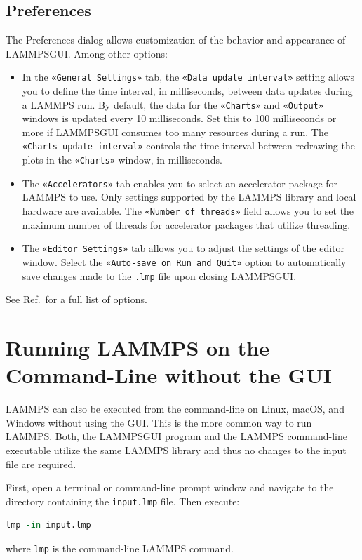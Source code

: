 \documentclass[9pt,tutorial]{livecoms}
\newcommand{\flecmd}[1]{\textcolor{command}{\texttt{#1}}} %
\newcommand{\guicmd}[1]{\textcolor{command}{\texttt{«#1»}}} %
\newcommand{\lammpsgui}{\textsf{LAMMPS\textendash GUI}}
\begin{document}
\begin{appendices}
\subsection{Preferences}

The Preferences dialog allows customization of the behavior and appearance of
\lammpsgui{}.  Among other options:
\begin{itemize}
\item In the \guicmd{General Settings} tab, the \guicmd{Data update interval} setting
allows you to define the time interval, in milliseconds, between data updates during
a LAMMPS run.  By default, the data for the \guicmd{Charts} and \guicmd{Output}
windows is updated every 10 milliseconds.  Set this to 100 milliseconds or more
if \lammpsgui{} consumes too many resources during a run.  The \guicmd{Charts update interval}
controls the time interval between redrawing the plots in the \guicmd{Charts} window, in milliseconds.
\item The \guicmd{Accelerators} tab enables you to select an accelerator package
for LAMMPS to use.  Only settings supported by the LAMMPS library and local hardware
are available.  The \guicmd{Number of threads} field allows you to set the maximum
number of threads for accelerator packages that utilize threading.
\item The \guicmd{Editor Settings} tab allows you to adjust the settings of the editor
window.  Select the \guicmd{Auto-save on Run and Quit} option to automatically save changes
made to the \flecmd{.lmp} file upon closing \lammpsgui{}.
\end{itemize}
See Ref.\, for a full list of options.

\section{Running LAMMPS on the Command-Line without the GUI}
\label{command-line-label}

LAMMPS can also be executed from the command-line on Linux, macOS, and
Windows without using the GUI.  This is the more common way to run LAMMPS.
Both, the \lammpsgui{} program and the LAMMPS command-line executable
utilize the same LAMMPS library and thus no changes to the input file are required.

First, open a terminal or command-line prompt window and navigate to the
directory containing the \flecmd{input.lmp} file.  Then execute:
\begin{lstlisting}[language=tcl]
lmp -in input.lmp
\end{lstlisting}
where \flecmd{lmp} is the command-line LAMMPS command.


\end{appendices}
\end{document}
